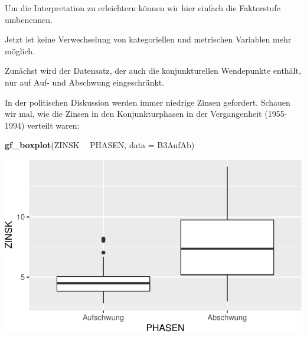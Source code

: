 \documentclass[12pt,ngerman,paper=a4,pagesize,DIV=13]{scrreprt}
\newenvironment{Shaded}{\begin{snugshade}}{\end{snugshade}}
\newcommand{\DataTypeTok}[1]{\textcolor[rgb]{0.13,0.29,0.53}{#1}}
\newcommand{\KeywordTok}[1]{\textcolor[rgb]{0.13,0.29,0.53}{\textbf{#1}}}
\newcommand{\NormalTok}[1]{#1}
\newcommand{\OperatorTok}[1]{\textcolor[rgb]{0.81,0.36,0.00}{\textbf{#1}}}
\newcommand{\StringTok}[1]{\textcolor[rgb]{0.31,0.60,0.02}{#1}}
\begin{document}
Um die Interpretation zu erleichtern können wir hier einfach die
Faktorstufe umbenennen.

\begin{Shaded}
\end{Shaded}

Jetzt ist keine Verwechselung von kategoriellen und metrischen Variablen
mehr möglich.

Zunächst wird der Datensatz, der auch die konjunkturellen Wendepunkte
enthält, nur auf Auf- und Abschwung eingeschränkt.

\begin{Shaded}
\end{Shaded}

In der politischen Diskussion werden immer niedrige Zinsen gefordert.
Schauen wir mal, wie die Zinsen in den Konjunkturphasen in der
Vergangenheit (1955-1994) verteilt waren:

\begin{Shaded}
\begin{Highlighting}[]
\KeywordTok{gf_boxplot}\NormalTok{(ZINSK }\OperatorTok{~}\StringTok{ }\NormalTok{PHASEN, }\DataTypeTok{data =}\NormalTok{ B3AufAb)}
\end{Highlighting}
\end{Shaded}

\includegraphics{DatenerhebungStatistik-Uebung_files/figure-latex/unnamed-chunk-137-1.pdf}
\end{document}
